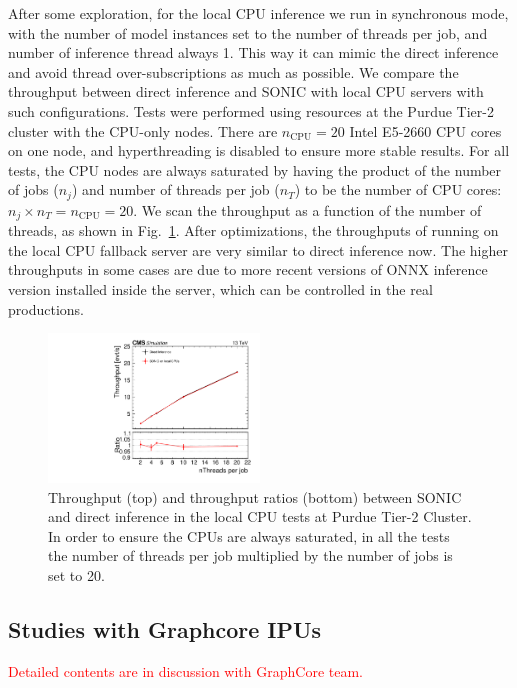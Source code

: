 After some exploration, for the local CPU inference we run in synchronous mode, with the number of model instances set to the number of threads per job, and number of inference thread always 1. This way it can mimic the direct inference and avoid thread over-subscriptions as much as possible. We compare the throughput between direct inference and SONIC with local CPU servers with such configurations. Tests were performed using resources at the Purdue Tier-2 cluster with the CPU-only nodes. There are $n_{\text{CPU}}=20$ Intel E5-2660 CPU cores on one node, and hyperthreading is disabled to ensure more stable results. For all tests, the CPU nodes are always saturated by having the product of the number of jobs ($n_j$) and number of threads per job ($n_T$) to be the number of CPU cores: $n_j\times n_T = n_{\text{CPU}} = 20$. We scan the throughput as a function of the number of threads, as shown in Fig.~\ref{fig:throughput_cpu}. After optimizations, the throughputs of running on the local CPU fallback server are very similar to direct inference now. The higher throughputs in some cases are due to more recent versions of ONNX inference version installed inside the server, which can be controlled in the real productions.

\begin{figure}
    \centering
    \includegraphics[width=0.50\textwidth]{plots/CPUTest_throughput.pdf}
    \caption{Throughput (top) and throughput ratios (bottom) between SONIC and direct inference in the local CPU tests at Purdue Tier-2 Cluster. In order to ensure the CPUs are always saturated, in all the tests the number of threads per job multiplied by the number of jobs is set to 20.}
    \label{fig:throughput_cpu}
\end{figure}


\subsection{Studies with Graphcore IPUs}
\textcolor{red}{Detailed contents are in discussion with GraphCore team.}

